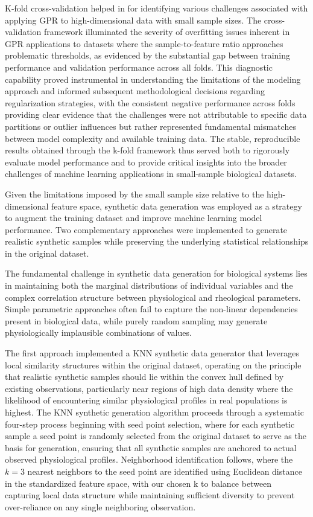 \documentclass[12pt,letterpaper]{article}
\begin{document}
K-fold cross-validation helped in for identifying various challenges associated with applying GPR to high-dimensional data with small sample sizes.
The cross-validation framework illuminated the severity of overfitting issues inherent in GPR applications to datasets where the sample-to-feature ratio approaches problematic thresholds,
as evidenced by the substantial gap between training performance and validation performance across all folds. This diagnostic capability proved instrumental in understanding the
limitations of the modeling approach and informed subsequent methodological decisions regarding regularization strategies, with the consistent negative performance across folds
providing clear evidence that the challenges were not attributable to specific data partitions or outlier influences but rather represented fundamental mismatches between model
complexity and available training data. The stable, reproducible results obtained through the k-fold framework thus served both to rigorously evaluate model performance and to provide
critical insights into the broader challenges of machine learning applications in small-sample biological datasets.

Given the limitations imposed by the small sample size relative to the high-dimensional feature space, synthetic data generation was employed as a strategy
to augment the training dataset and improve machine learning model performance. Two complementary approaches were implemented to generate realistic synthetic
samples while preserving the underlying statistical relationships in the original dataset.

The fundamental challenge in synthetic data generation for biological systems lies in maintaining both the marginal distributions of individual variables
and the complex correlation structure between physiological and rheological parameters. Simple parametric approaches often fail to capture the non-linear dependencies
present in biological data, while purely random sampling may generate physiologically implausible combinations of values.

The first approach implemented a KNN synthetic data generator that leverages local similarity structures within the original dataset,
operating on the principle that realistic synthetic samples should lie within the convex hull defined by existing observations, particularly near regions of high data density where
the likelihood of encountering similar physiological profiles in real populations is highest. The KNN synthetic generation algorithm proceeds through a systematic four-step process
beginning with seed point selection, where for each synthetic sample a seed point is randomly selected from the original dataset to serve as the basis for generation, ensuring that
all synthetic samples are anchored to actual observed physiological profiles. Neighborhood identification follows, where the $k=3$ nearest neighbors to the seed point are identified
using Euclidean distance in the standardized feature space, with our chosen k to balance between capturing local data structure while maintaining sufficient diversity to
prevent over-reliance on any single neighboring observation.
\end{document}
